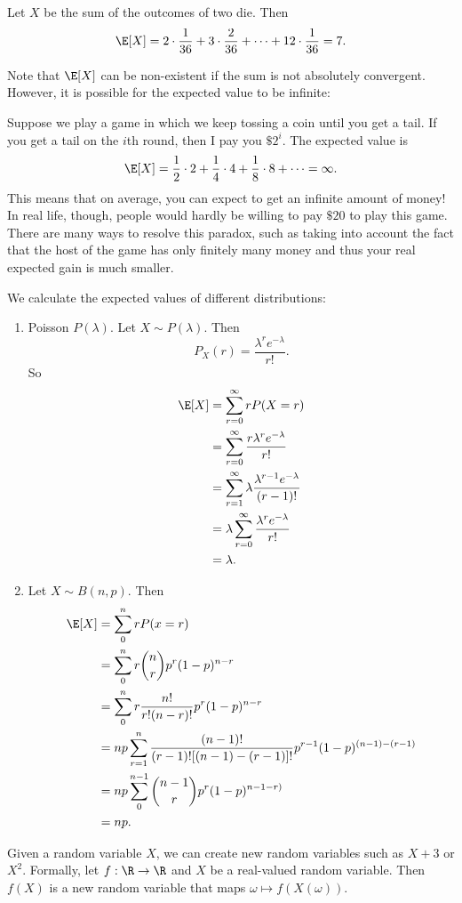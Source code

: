 \documentclass[a4paper]{article}
\begin{document}
\begin{eg}
  Let $X$ be the sum of the outcomes of two die. Then
  \[
    \E[X] = 2\cdot \frac{1}{36} + 3\cdot \frac{2}{36} + \cdots + 12\cdot \frac{1}{36} = 7.
  \]
\end{eg}
Note that $\E[X]$ can be non-existent if the sum is not absolutely convergent. However, it is possible for the expected value to be infinite:

\begin{eg}
  Suppose we play a game in which we keep tossing a coin until you get a tail. If you get a tail on the $i$th round, then I pay you $\$2^i$. The expected value is
  \[
    \E[X] = \frac{1}{2}\cdot 2 + \frac{1}{4}\cdot 4 + \frac{1}{8}\cdot 8 + \cdots = \infty.
  \]
  This means that on average, you can expect to get an infinite amount of money! In real life, though, people would hardly be willing to pay $\$20$ to play this game. There are many ways to resolve this paradox, such as taking into account the fact that the host of the game has only finitely many money and thus your real expected gain is much smaller.
\end{eg}

\begin{eg}
  We calculate the expected values of different distributions:
  \begin{enumerate}
    \item Poisson $P(\lambda)$. Let $X\sim P(\lambda)$. Then
      \[
        P_X(r) = \frac{\lambda^r e^{-\lambda}}{r!}.
      \]
      So
      \begin{align*}
        \E[X] &= \sum_{r = 0}^\infty rP(X = r)\\
        &= \sum_{r = 0}^\infty \frac{r \lambda^r e^{-\lambda}}{r!}\\
        &= \sum_{r = 1}^\infty \lambda \frac{\lambda^{r - 1}e^{-\lambda}}{(r - 1)!}\\
        &= \lambda\sum_{r = 0}^\infty\frac{\lambda^r e^{-\lambda}}{r!}\\
        &= \lambda.
      \end{align*}
    \item Let $X\sim B(n, p)$. Then
      \begin{align*}
        \E[X] &= \sum_0^n rP(x = r)\\
        &= \sum_0^n r\binom{n}{r} p^r(1 - p)^{n - r}\\
        &= \sum_0^n r\frac{n!}{r!(n - r)!}p^r (1 - p)^{n - r}\\
        &= np\sum_{r = 1}^n \frac{(n - 1)!}{(r - 1)![(n - 1) - (r - 1)]!}p^{r - 1}(1 - p)^{(n - 1) - (r - 1)}\\
        &= np\sum_{0}^{n - 1}\binom{n - 1}{r}p^r(1 - p)^{n - 1 - r)}\\
        &= np.
      \end{align*}
  \end{enumerate}
\end{eg}
Given a random variable $X$, we can create new random variables such as $X + 3$ or $X^2$. Formally, let $f: \R \to \R$ and $X$ be a real-valued random variable. Then $f(X)$ is a new random variable that maps $\omega \mapsto f(X(\omega))$.
\end{document}
